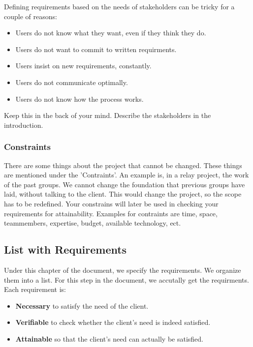 \documentclass[10pt]{report}
\begin{document}
\noindent Defining requirements based on the needs of stakeholders can be tricky for a couple of reasons:

\begin{itemize}
	\item Users do not know what they want, even if they think they do.
	\item Users do not want to commit to written requirments.
	\item Users insist on new requirements, constantly.
	\item Users do not communicate optimally.
	\item Users do not know how the process works.
\end{itemize}

\noindent Keep this in the back of your mind. Describe the stakeholders in the introduction.

\subsubsection{Constraints}

There are some things about the project that cannot be changed. These things are mentioned under the 'Contraints'. An example is, in a relay project, the work of the past groups. We cannot change the foundation that previous groups have laid, without talking to the client. This would change the project, so the scope has to be redefined. Your constrains will later be used in checking your requirements for attainability. Examples for contraints are time, space, teammembers, expertise, budget, available technology, ect.

\subsection{List with Requirements}

Under this chapter of the document, we specify the requirements. We organize them into a list. For this step in the document, we accutally get the requirments. Each requirement is:

\begin{itemize}
	\item \textbf{Necessary} to satisfy the need of the client. 
	\item \textbf{Verifiable} to check whether the client's need is indeed satisfied. 
	\item \textbf{Attainable} so that the client's need can actually be satisfied. 
\end{itemize}
\end{document}

